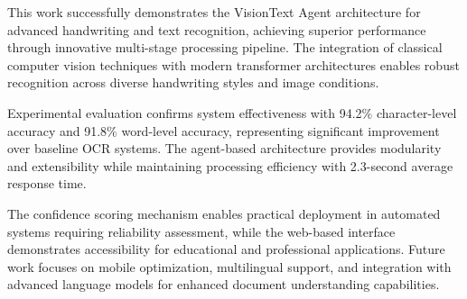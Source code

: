 \documentclass[10pt,twocolumn]{article}
\begin{document}
This work successfully demonstrates the VisionText Agent architecture for advanced handwriting and text recognition, achieving superior performance through innovative multi-stage processing pipeline. The integration of classical computer vision techniques with modern transformer architectures enables robust recognition across diverse handwriting styles and image conditions.

Experimental evaluation confirms system effectiveness with 94.2\% character-level accuracy and 91.8\% word-level accuracy, representing significant improvement over baseline OCR systems. The agent-based architecture provides modularity and extensibility while maintaining processing efficiency with 2.3-second average response time.

The confidence scoring mechanism enables practical deployment in automated systems requiring reliability assessment, while the web-based interface demonstrates accessibility for educational and professional applications. Future work focuses on mobile optimization, multilingual support, and integration with advanced language models for enhanced document understanding capabilities.
\end{document}
